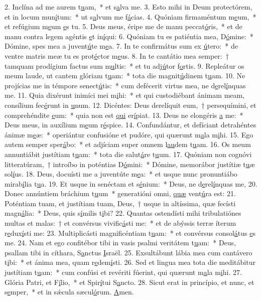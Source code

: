 2. Inclína ad me aurem t\uline{u}am,~* et s\uline{a}lva me.
3. Esto mihi in Deum protectórem, et in locum mun\uline{í}tum:~* ut s\uline{a}lvum me f\uline{á}cias.
4. Quóniam firmaméntum m\uline{e}um,~* et refúgium m\uline{e}um \uline{e}s tu.
5. Deus meus, éripe me de manu peccat\uline{ó}ris,~* et de manu contra legem agéntis \uline{e}t in\uline{í}qui:
6. Quóniam tu es patiéntia mea, D\uline{ó}mine:~* Dómine, spes mea a juvent\uline{ú}te m\uline{e}a.
7. In te confirmátus sum ex \uline{ú}tero:~* de ventre matris meæ tu es prot\uline{é}ctor m\uline{e}us.
8. In te cantátio mea semper:~† tamquam prodígium factus sum m\uline{u}ltis:~* et tu adj\uline{ú}tor f\uline{o}rtis.
9. Repleátur os meum laude, ut cantem glóriam t\uline{u}am:~* tota die magnit\uline{ú}dinem t\uline{u}am.
10. Ne projícias me in témpore senect\uline{ú}tis:~* cum defécerit virtus mea, ne d\uline{e}rel\uline{í}nquas me.
11. Quia dixérunt inimíci mei m\uline{i}hi:~* et qui custodiébant ánimam meam, consílium fec\uline{é}runt in \uline{u}num.
12. Dicéntes: Deus derelíquit eum,~† persequímini, et comprehéndite \uline{e}um:~* quia non est \uline{qui} er\uline{í}piat.
13. Deus ne elongéris \uline{a} me:~* Deus meus, in auxílium m\uline{e}um r\uline{é}spice.
14. Confundántur, et defíciant detrahéntes ánimæ m\uline{e}æ:~* operiántur confusióne et pudóre, qui quærunt m\uline{a}la m\uline{i}hi.
15. Ego autem semper sper\uline{á}bo:~* et adjíciam super omnem l\uline{au}dem t\uline{u}am.
16. Os meum annuntiábit justítiam t\uline{u}am:~* tota die salut\uline{á}re t\uline{u}um.
17. Quóniam non cognóvi litteratúram,~† introíbo in poténtias D\uline{ó}mini:~* Dómine, memorábor justítiæ t\uline{u}æ sol\uline{í}us.
18. Deus, docuísti me a juventúte m\uline{e}a:~* et usque nunc pronuntiábo mirab\uline{í}lia t\uline{u}a.
19. Et usque in senéctam et s\uline{é}nium:~* Deus, ne d\uline{e}rel\uline{í}nquas me,
20. Donec annúntiem bráchium t\uline{u}um~* generatióni omni, \uline{quæ} vent\uline{ú}ra est:
21. Poténtiam tuam, et justítiam tuam, Deus,~† usque in altíssima, quæ fecísti magn\uline{á}lia:~* Deus, quis s\uline{í}milis t\uline{i}bi?
22. Quantas ostendísti mihi tribulatiónes multas et malas:~† et convérsus vivific\uline{á}sti me:~* et de abýssis terræ íterum r\uline{e}dux\uline{í}sti me:
23. Multiplicásti magnificéntiam t\uline{u}am:~* et convérsus consol\uline{á}tus \uline{e}s me.
24. Nam et ego confitébor tibi in vasis psalmi veritátem t\uline{u}am:~* Deus, psallam tibi in cíthara, S\uline{a}nctus \uline{I}sraël.
25. Exsultábunt lábia mea cum cantávero t\uline{i}bi:~* et ánima mea, quam r\uline{e}dem\uline{í}sti.
26. Sed et lingua mea tota die meditábitur justítiam t\uline{u}am:~* cum confúsi et revériti fúerint, qui quærunt m\uline{a}la m\uline{i}hi.
27. Glória Patri, et F\uline{í}lio,~* et Spir\uline{í}tui S\uline{a}ncto.
28. Sicut erat in princípio, et nunc, et s\uline{e}mper,~* et in sǽcula sæcul\uline{ó}rum. \uline{A}men.
